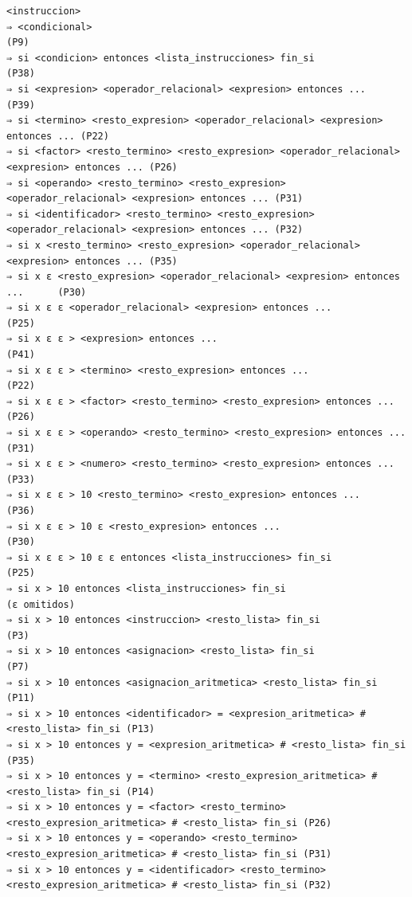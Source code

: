 \documentclass[11pt,letterpaper]{article}
\begin{document}
\begin{lstlisting}[basicstyle=\ttfamily\footnotesize]
<instruccion>
⇒ <condicional>                                                              (P9)
⇒ si <condicion> entonces <lista_instrucciones> fin_si                       (P38)
⇒ si <expresion> <operador_relacional> <expresion> entonces ...              (P39)
⇒ si <termino> <resto_expresion> <operador_relacional> <expresion> entonces ... (P22)
⇒ si <factor> <resto_termino> <resto_expresion> <operador_relacional> <expresion> entonces ... (P26)
⇒ si <operando> <resto_termino> <resto_expresion> <operador_relacional> <expresion> entonces ... (P31)
⇒ si <identificador> <resto_termino> <resto_expresion> <operador_relacional> <expresion> entonces ... (P32)
⇒ si x <resto_termino> <resto_expresion> <operador_relacional> <expresion> entonces ... (P35)
⇒ si x ε <resto_expresion> <operador_relacional> <expresion> entonces ...      (P30)
⇒ si x ε ε <operador_relacional> <expresion> entonces ...                     (P25)
⇒ si x ε ε > <expresion> entonces ...                                         (P41)
⇒ si x ε ε > <termino> <resto_expresion> entonces ...                         (P22)
⇒ si x ε ε > <factor> <resto_termino> <resto_expresion> entonces ...          (P26)
⇒ si x ε ε > <operando> <resto_termino> <resto_expresion> entonces ...        (P31)
⇒ si x ε ε > <numero> <resto_termino> <resto_expresion> entonces ...          (P33)
⇒ si x ε ε > 10 <resto_termino> <resto_expresion> entonces ...                (P36)
⇒ si x ε ε > 10 ε <resto_expresion> entonces ...                              (P30)
⇒ si x ε ε > 10 ε ε entonces <lista_instrucciones> fin_si                   (P25)
⇒ si x > 10 entonces <lista_instrucciones> fin_si                           (ε omitidos)
⇒ si x > 10 entonces <instruccion> <resto_lista> fin_si                     (P3)
⇒ si x > 10 entonces <asignacion> <resto_lista> fin_si                      (P7)
⇒ si x > 10 entonces <asignacion_aritmetica> <resto_lista> fin_si           (P11)
⇒ si x > 10 entonces <identificador> = <expresion_aritmetica> # <resto_lista> fin_si (P13)
⇒ si x > 10 entonces y = <expresion_aritmetica> # <resto_lista> fin_si       (P35)
⇒ si x > 10 entonces y = <termino> <resto_expresion_aritmetica> # <resto_lista> fin_si (P14)
⇒ si x > 10 entonces y = <factor> <resto_termino> <resto_expresion_aritmetica> # <resto_lista> fin_si (P26)
⇒ si x > 10 entonces y = <operando> <resto_termino> <resto_expresion_aritmetica> # <resto_lista> fin_si (P31)
⇒ si x > 10 entonces y = <identificador> <resto_termino> <resto_expresion_aritmetica> # <resto_lista> fin_si (P32)

\end{lstlisting}
\end{document}
